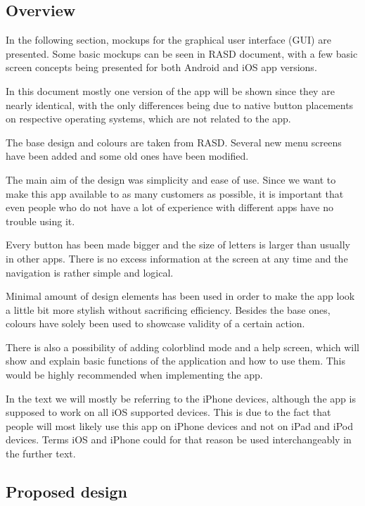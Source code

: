 \subsection{Overview}
In the following section, mockups for the graphical user interface (GUI) are presented.  
Some basic mockups can be seen in RASD document, with a few basic screen concepts being presented for both Android and iOS app versions. \newline

In this document mostly one version of the app will be shown since they are nearly identical, with the only differences being due to native button placements on respective operating systems, which are not related to the app. \newline
 
The base design and colours are taken from RASD. Several new menu screens have been added and some old ones have been modified.  

The main aim of the design was simplicity and ease of use. Since we want to make this app available to as many customers as possible, it is important that even people who do not have a lot of experience with different apps have no trouble using it. \newline 

Every button has been made bigger and the size of letters is larger than usually in other apps. There is no excess information at the screen at any time and the navigation is rather simple and logical.  \newline

Minimal amount of design elements has been used in order to make the app look a little bit more stylish without sacrificing efficiency. Besides the base ones, colours have solely been used to showcase validity of a certain action.  \newline


There is also a possibility of adding colorblind mode and a help screen, which will show and explain basic functions of the application and how to use them. This would be highly recommended when implementing the app. \newline

In the text we will mostly be referring to the iPhone devices, although the app is supposed to work on all iOS supported devices. This is due to the fact that people will most likely use this app on iPhone devices and not on iPad and iPod devices. Terms iOS and iPhone could for that reason be used interchangeably in the further text.
\newpage
\subsection{Proposed design}

